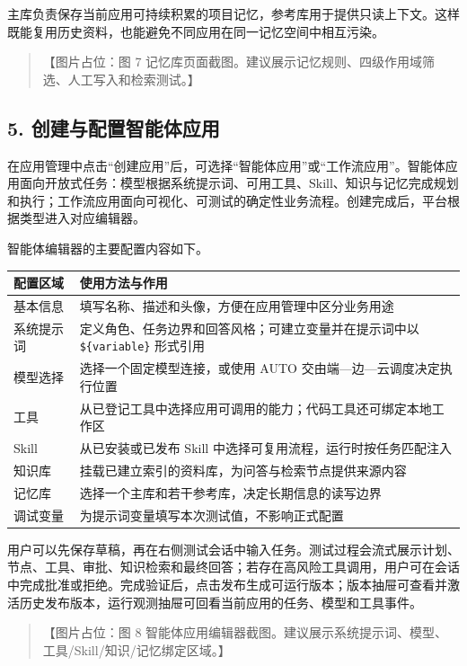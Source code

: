 \documentclass[UTF8,a4paper,12pt]{ctexart}
\begin{document}
主库负责保存当前应用可持续积累的项目记忆，参考库用于提供只读上下文。这样既能复用历史资料，也能避免不同应用在同一记忆空间中相互污染。

\begin{quote}
【图片占位：图 7 记忆库页面截图。建议展示记忆规则、四级作用域筛选、人工写入和检索测试。】
\end{quote}

\subsection{5. 创建与配置智能体应用}

在应用管理中点击``创建应用''后，可选择``智能体应用''或``工作流应用''。智能体应用面向开放式任务：模型根据系统提示词、可用工具、Skill、知识与记忆完成规划和执行；工作流应用面向可视化、可测试的确定性业务流程。创建完成后，平台根据类型进入对应编辑器。

智能体编辑器的主要配置内容如下。

\begin{longtable}[]{@{}ll@{}}
\toprule
配置区域 & 使用方法与作用 \\
\midrule
\endhead
基本信息 & 填写名称、描述和头像，方便在应用管理中区分业务用途 \\
系统提示词 & 定义角色、任务边界和回答风格；可建立变量并在提示词中以 \texttt{\$\{variable\}} 形式引用 \\
模型选择 & 选择一个固定模型连接，或使用 AUTO 交由端—边—云调度决定执行位置 \\
工具 & 从已登记工具中选择应用可调用的能力；代码工具还可绑定本地工作区 \\
Skill & 从已安装或已发布 Skill 中选择可复用流程，运行时按任务匹配注入 \\
知识库 & 挂载已建立索引的资料库，为问答与检索节点提供来源内容 \\
记忆库 & 选择一个主库和若干参考库，决定长期信息的读写边界 \\
调试变量 & 为提示词变量填写本次测试值，不影响正式配置 \\
\bottomrule
\end{longtable}

用户可以先保存草稿，再在右侧测试会话中输入任务。测试过程会流式展示计划、节点、工具、审批、知识检索和最终回答；若存在高风险工具调用，用户可在会话中完成批准或拒绝。完成验证后，点击发布生成可运行版本；版本抽屉可查看并激活历史发布版本，运行观测抽屉可回看当前应用的任务、模型和工具事件。

\begin{quote}
【图片占位：图 8 智能体应用编辑器截图。建议展示系统提示词、模型、工具/Skill/知识/记忆绑定区域。】
\end{quote}
\end{document}

